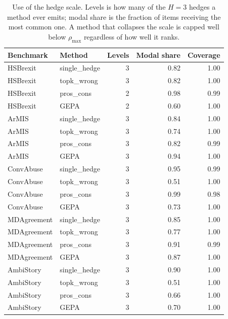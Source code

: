 \begin{table}[t]
\centering
\small
\begin{tabular}{llrrr}
\hline
Benchmark & Method & Levels & Modal share & Coverage \\
\hline
HSBrexit & single\_hedge & 3 & 0.82 & 1.00 \\
HSBrexit & topk\_wrong & 3 & 0.82 & 1.00 \\
HSBrexit & pros\_cons & 2 & 0.98 & 0.99 \\
HSBrexit & GEPA & 2 & 0.60 & 1.00 \\
ArMIS & single\_hedge & 3 & 0.84 & 1.00 \\
ArMIS & topk\_wrong & 3 & 0.74 & 1.00 \\
ArMIS & pros\_cons & 3 & 0.82 & 0.99 \\
ArMIS & GEPA & 3 & 0.94 & 1.00 \\
ConvAbuse & single\_hedge & 3 & 0.95 & 0.99 \\
ConvAbuse & topk\_wrong & 3 & 0.51 & 1.00 \\
ConvAbuse & pros\_cons & 3 & 0.99 & 0.98 \\
ConvAbuse & GEPA & 3 & 0.73 & 1.00 \\
MDAgreement & single\_hedge & 3 & 0.85 & 1.00 \\
MDAgreement & topk\_wrong & 3 & 0.77 & 1.00 \\
MDAgreement & pros\_cons & 3 & 0.91 & 0.99 \\
MDAgreement & GEPA & 3 & 0.87 & 1.00 \\
AmbiStory & single\_hedge & 3 & 0.90 & 1.00 \\
AmbiStory & topk\_wrong & 3 & 0.51 & 1.00 \\
AmbiStory & pros\_cons & 3 & 0.66 & 1.00 \\
AmbiStory & GEPA & 3 & 0.70 & 1.00 \\
\hline
\end{tabular}
\caption{Use of the hedge scale. Levels is how many of the $H=3$ hedges a method ever emits; modal share is the fraction of items receiving the most common one. A method that collapses the scale is capped well below $\rho_{\max}$ regardless of how well it ranks.}
\label{tab:stability}
\end{table}